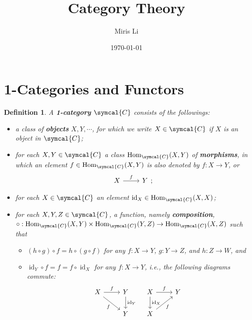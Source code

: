 \documentclass{article}
\title{Category Theory}
\author{Miris Li}
\date{\today}
\theoremstyle{theorem}
\newtheorem{definition}{Definition}[section]
\theoremstyle{remark}
\def\calC{{\symcal{C}}}
\DeclareMathOperator{\Hom}{Hom}
\DeclareMathOperator{\id}{id}
\begin{document}
\maketitle

\section{1-Categories and Functors}

\begin{definition}
    A \textbf{1-category} $\calC$ consists of the followings:
    \begin{itemize}
        \item a class of \textbf{objects} $X, Y, \cdots$, for which we write $X \in \calC$ if $X$ is an object in $\calC$;
        \item for each $X, Y \in \calC$ a class $\Hom_\calC(X, Y)$ of \textbf{morphisms}, in which an element $f \in \Hom_\calC(X, Y)$ is also denoted by $f : X \to Y$, or 
        $$\begin{tikzcd}
            X & Y
            \arrow["f", from=1-1, to=1-2]
        \end{tikzcd};$$
        \item for each $X \in \calC$ an element $\id_X \in \Hom_\calC(X, X)$;
        \item for each $X, Y, Z \in \calC$, a function, namely \textbf{composition}, $\circ : \Hom_\calC(X, Y) \times \Hom_\calC(Y, Z) \to \Hom_\calC(X, Z)$ such that 
        \begin{itemize}
            \item $(h \circ g) \circ f = h \circ (g \circ f)$ for any $f : X \to Y$, $g : Y \to Z$, and $h : Z \to W$, and
            \item $\id_Y \circ f = f = f \circ \id_X$ for any $f : X \to Y$, i.e., the following diagrams commute:
            $$\begin{tikzcd}
	            X & Y \\
	            & Y
	            \arrow["f", from=1-1, to=1-2]
	            \arrow["f"', from=1-1, to=2-2]
	            \arrow["{\id_Y}", from=1-2, to=2-2]
            \end{tikzcd} 
            \quad 
            \begin{tikzcd}
                X & Y \\
                X
                \arrow["f", from=1-1, to=1-2]
                \arrow["{\id_X}", from=1-1, to=2-1]
                \arrow["f"', from=2-1, to=1-2]
            \end{tikzcd}$$
        \end{itemize}
    \end{itemize}
\end{definition}
\end{document}
